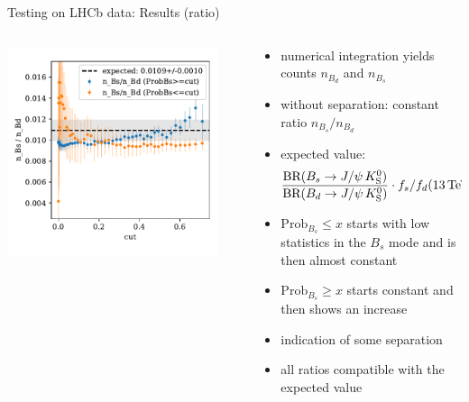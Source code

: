 \documentclass[aspectratio=1610, 10pt]{beamer}
\begin{document}
\begin{frame}{Testing on LHCb data: Results (ratio)}
  \begin{columns}
    \begin{column}{0.5\textwidth}
      \centering
      \includegraphics[width=0.9\textwidth]{images/data_ratio.pdf}
    \end{column}
    \begin{column}{0.5\textwidth}
      \begin{itemize}
        \item numerical integration yields counts $n_{B_d}$ and $n_{B_s}$
        \item without separation: constant ratio $n_{B_s}/n_{B_d}$
        \item expected value: \\
        \begin{equation*}
          \frac{\text{BR}(B_s \rightarrow J/\psi \, K^0_\text{S})}{\text{BR}(B_d \rightarrow J/\psi \, K^0_\text{S})} \cdot f_s/f_d(\qty{13}{\TeV}) = \num{0.0109\pm0.0010}
        \end{equation*}
        \item $\text{Prob}_{B_s} \leq x$ starts with low statistics in the $B_s$ mode and is then almost constant
        \item $\text{Prob}_{B_s} \geq x$ starts constant and then shows an increase 
        \item indication of some separation
        \item all ratios compatible with the expected value
      \end{itemize}
    \end{column}
  \end{columns}
\end{frame}
\end{document}
